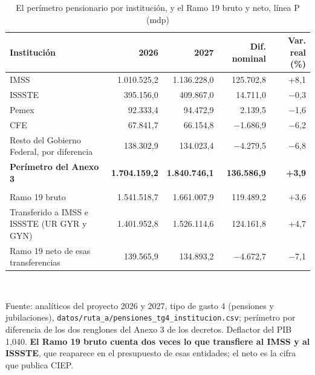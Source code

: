 \begin{table}[htbp]\centering\footnotesize
\caption{El perímetro pensionario por institución, y el Ramo 19 bruto y neto, línea P (mdp)}\label{cua:pensinst}
\begin{tabular}{>{\raggedright\arraybackslash}p{4.6cm}rrrr}
\toprule
Institución & 2026 & 2027 & Dif. nominal & Var. real (\%) \\
\midrule
IMSS & 1.010.525,2 & 1.136.228,0 & 125.702,8 & +8,1 \\
ISSSTE & 395.156,0 & 409.867,0 & 14.711,0 & $-$0,3 \\
Pemex & 92.333,4 & 94.472,9 & 2.139,5 & $-$1,6 \\
CFE & 67.841,7 & 66.154,8 & $-$1.686,9 & $-$6,2 \\
Resto del Gobierno Federal, por diferencia & 138.302,9 & 134.023,4 & $-$4.279,5 & $-$6,8 \\
\midrule \textbf{Perímetro del Anexo 3} & \textbf{1.704.159,2} & \textbf{1.840.746,1} & \textbf{136.586,9} & \textbf{+3,9} \\
\midrule \multicolumn{5}{l}{\emph{Ramo 19: no se suma a lo anterior}} \\
Ramo 19 bruto & 1.541.518,7 & 1.661.007,9 & 119.489,2 & +3,6 \\
Transferido a IMSS e ISSSTE (UR GYR y GYN) & 1.401.952,8 & 1.526.114,6 & 124.161,8 & +4,7 \\
Ramo 19 neto de esas transferencias & 139.565,9 & 134.893,2 & $-$4.672,7 & $-$7,1 \\
\bottomrule
\end{tabular}
\\[2pt]\begin{minipage}{0.92\textwidth}\scriptsize Fuente: analíticos del proyecto 2026 y 2027, tipo de gasto 4 (pensiones y jubilaciones), \texttt{datos/ruta\_a/pensiones\_tg4\_institucion.csv}; perímetro por diferencia de los dos renglones del Anexo 3 de los decretos. Deflactor del PIB 1,040. \textbf{El Ramo 19 bruto cuenta dos veces lo que transfiere al IMSS y al ISSSTE}, que reaparece en el presupuesto de esas entidades; el neto es la cifra que publica CIEP.\end{minipage}
\end{table}
